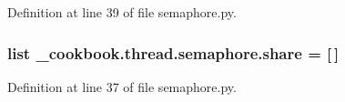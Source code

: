 Definition at line 39 of file semaphore.\-py.

\hypertarget{namespace__cookbook_1_1thread_1_1semaphore_a9a0b5a124aff3e078787972f21d297e3}{
\subsubsection[{share}]{\setlength{\rightskip}{0pt plus 5cm}list \-\_\-cookbook.\-thread.\-semaphore.\-share = \mbox{[}$\,$\mbox{]}}}\label{namespace__cookbook_1_1thread_1_1semaphore_a9a0b5a124aff3e078787972f21d297e3}


Definition at line 37 of file semaphore.\-py.

